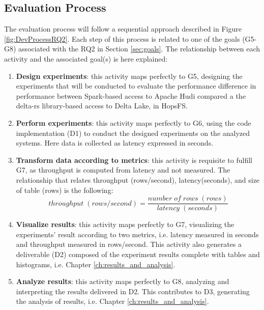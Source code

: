 \subsection{Evaluation Process}
\label{subsec:eval_process_and_research_paradigm}
The evaluation process will follow a sequential approach described in Figure \ref{fig:DevProcessRQ2}. Each step of this process is related to one of the goals (G5-G8) associated with the RQ2 in Section \ref{sec:goals}.
The relationship between each activity and the associated goal(s) is here explained:
\begin{enumerate}
    \item \textbf{Design experiments}: this activity maps perfectly to G5, designing the experiments that will be conducted to evaluate the performance difference in performance between Spark-based access to Apache Hudi compared a the delta-rs \cite{DeltaioDeltars2024} library-based access to Delta Lake, in \gls{HopsFS}. 
    \item \textbf{Perform experiments}: this activity maps perfectly to G6, using the code implementation (D1) to conduct the designed experiments on the analyzed systems. Here data is collected as latency expressed in seconds.
    \item \textbf{Transform data according to metrics}: this activity is requisite to fulfill G7, as throughput is computed from latency and not measured. The relationship that relates throughput (rows/second), latency(seconds), and size of table (rows) is the following:
    \[ throughput \; (rows/second) = \frac{number \; of \; rows \; (rows)}{latency \;(seconds)}\]
    \item \textbf{Visualize results}: this activity maps perfectly to G7, visualizing the experiments' result according to two metrics, i.e. latency measured in seconds and throughput measured in rows/second. This activity also generates a deliverable (D2) composed of the experiment results complete with tables and histograms, i.e. Chapter \ref{ch:results_and_analysis}.
    \item \textbf{Analyze results}: this activity maps perfectly to G8, analyzing and interpreting the results delivered in D2. This contributes to D3, generating the analysis of results, i.e. Chapter \ref{ch:results_and_analysis}.
\end{enumerate}
